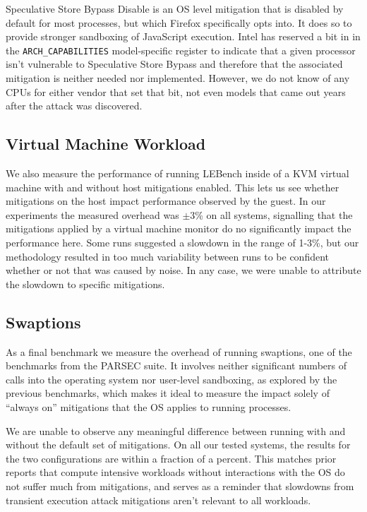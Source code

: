 Speculative Store Bypass Disable is an OS level mitigation that is disabled by default for most processes, but which Firefox specifically opts into.
It does so to provide stronger sandboxing of JavaScript execution.
Intel has reserved a bit in in the \texttt{ARCH\_CAPABILITIES} model-specific register to indicate that a given processor isn't vulnerable to Speculative Store Bypass and therefore that the associated mitigation is neither needed nor implemented.
However, we do not know of any CPUs for either vendor that set that bit, not even models that came out years after the attack was discovered.

\subsection{Virtual Machine Workload}

We also measure the performance of running LEBench inside of a KVM virtual machine with and without host mitigations enabled.
This lets us see whether mitigations on the host impact performance observed by the guest.
In our experiments the measured overhead was $\pm 3$\% on all systems, signalling that the mitigations applied by a virtual machine monitor do no significantly impact the performance here.
Some runs suggested a slowdown in the range of 1-3\%, but our methodology resulted in too much variability between runs to be confident whether or not that was caused by noise. 
In any case, we were unable to attribute the slowdown to specific mitigations.

\subsection{Swaptions}
\label{sec:parsec}
As a final benchmark we measure the overhead of running swaptions, one of the benchmarks from the PARSEC suite.
It involves neither significant numbers of calls into the operating system nor user-level sandboxing, as explored by the previous benchmarks, which makes it ideal to measure the impact solely of ``always on'' mitigations that the OS applies to running processes.

We are unable to observe any meaningful difference between running with and without the default set of mitigations.
On all our tested systems, the results for the two configurations are within a fraction of a percent.
This matches prior reports that compute intensive workloads without interactions with the OS do not suffer much from mitigations, and serves as a reminder that slowdowns from transient execution attack mitigations aren't relevant to all workloads.

